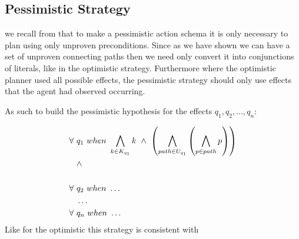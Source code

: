 \documentclass[\master/Master.tex]{subfiles}
\begin{document}
  	
  	
  	\subsection{Pessimistic Strategy}
  	
  we recall from  that to make a pessimistic action schema it is only necessary to plan using only unproven preconditions. Since as we have shown we can have a set of unproven connecting paths then we need only convert it into conjunctions of literals, like in the optimistic strategy. Furthermore where the optimistic planner used all possible effects, the pessimistic strategy should only use effects that the agent had observed occurring.
  
  As such to build the pessimistic hypothesis for the effects $q_1,q_2,\dots,q_n$:  	
  
  \begin{equation} \label{eq:ca:pes-preconds}
  \begin{split}  	
  \forall ~& q_1 ~ when ~ \bigwedge\limits_{k \in K_{q_1}} k ~ \land ~
  \left( \bigwedge \limits_{path \in U_{q_1}} \left( \bigwedge \limits_{p \in path} p\right)\right)
  \\
  & \land \\
  \\
  \forall ~& q_2 ~ when ~  \dots \\
  &\dots \\
  \forall ~& q_n ~ when ~  \dots
  \end{split}  	
  \end{equation}
  Like for the optimistic this strategy is consistent with 
  	
    
\end{document}
